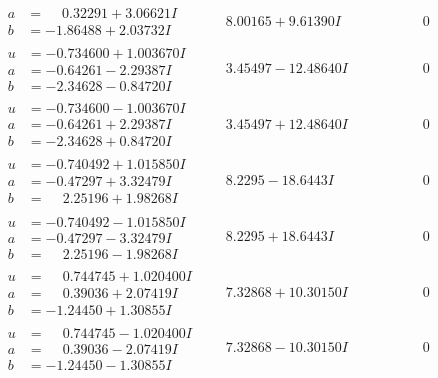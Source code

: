 \documentclass[1p]{elsarticle_modified}
\theoremstyle{definition}
\begin{document}
$$\begin{array}{c|c|c}
\begin{aligned}
a &= \phantom{-}0.32291 + 3.06621 I \\
b &= -1.86488 + 2.03732 I\end{aligned}
 & \phantom{-}8.00165 + 9.61390 I & \phantom{-0.000000 } 0 \\ \hline\begin{aligned}
u &= -0.734600 + 1.003670 I \\
a &= -0.64261 - 2.29387 I \\
b &= -2.34628 - 0.84720 I\end{aligned}
 & \phantom{-}3.45497 - 12.48640 I & \phantom{-0.000000 } 0 \\ \hline\begin{aligned}
u &= -0.734600 - 1.003670 I \\
a &= -0.64261 + 2.29387 I \\
b &= -2.34628 + 0.84720 I\end{aligned}
 & \phantom{-}3.45497 + 12.48640 I & \phantom{-0.000000 } 0 \\ \hline\begin{aligned}
u &= -0.740492 + 1.015850 I \\
a &= -0.47297 + 3.32479 I \\
b &= \phantom{-}2.25196 + 1.98268 I\end{aligned}
 & \phantom{-}8.2295 - 18.6443 I & \phantom{-0.000000 } 0 \\ \hline\begin{aligned}
u &= -0.740492 - 1.015850 I \\
a &= -0.47297 - 3.32479 I \\
b &= \phantom{-}2.25196 - 1.98268 I\end{aligned}
 & \phantom{-}8.2295 + 18.6443 I & \phantom{-0.000000 } 0 \\ \hline\begin{aligned}
u &= \phantom{-}0.744745 + 1.020400 I \\
a &= \phantom{-}0.39036 + 2.07419 I \\
b &= -1.24450 + 1.30855 I\end{aligned}
 & \phantom{-}7.32868 + 10.30150 I & \phantom{-0.000000 } 0 \\ \hline\begin{aligned}
u &= \phantom{-}0.744745 - 1.020400 I \\
a &= \phantom{-}0.39036 - 2.07419 I \\
b &= -1.24450 - 1.30855 I\end{aligned}
 & \phantom{-}7.32868 - 10.30150 I & \phantom{-0.000000 } 0\\

\end{array}$$
\end{document}
